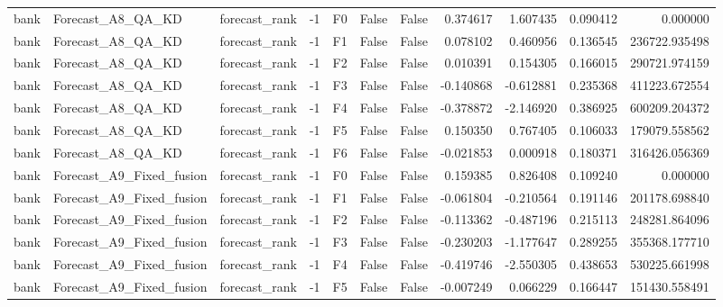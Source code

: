 \begin{tabular}{lllrlllrrrr}
      bank &            Forecast\_A8\_QA\_KD & forecast\_rank &    -1 &  F0 &           False &            False &  0.374617 &  1.607435 & 0.090412 &         0.000000 \\
      bank &            Forecast\_A8\_QA\_KD & forecast\_rank &    -1 &  F1 &           False &            False &  0.078102 &  0.460956 & 0.136545 &    236722.935498 \\
      bank &            Forecast\_A8\_QA\_KD & forecast\_rank &    -1 &  F2 &           False &            False &  0.010391 &  0.154305 & 0.166015 &    290721.974159 \\
      bank &            Forecast\_A8\_QA\_KD & forecast\_rank &    -1 &  F3 &           False &            False & -0.140868 & -0.612881 & 0.235368 &    411223.672554 \\
      bank &            Forecast\_A8\_QA\_KD & forecast\_rank &    -1 &  F4 &           False &            False & -0.378872 & -2.146920 & 0.386925 &    600209.204372 \\
      bank &            Forecast\_A8\_QA\_KD & forecast\_rank &    -1 &  F5 &           False &            False &  0.150350 &  0.767405 & 0.106033 &    179079.558562 \\
      bank &            Forecast\_A8\_QA\_KD & forecast\_rank &    -1 &  F6 &           False &            False & -0.021853 &  0.000918 & 0.180371 &    316426.056369 \\
      bank &     Forecast\_A9\_Fixed\_fusion & forecast\_rank &    -1 &  F0 &           False &            False &  0.159385 &  0.826408 & 0.109240 &         0.000000 \\
      bank &     Forecast\_A9\_Fixed\_fusion & forecast\_rank &    -1 &  F1 &           False &            False & -0.061804 & -0.210564 & 0.191146 &    201178.698840 \\
      bank &     Forecast\_A9\_Fixed\_fusion & forecast\_rank &    -1 &  F2 &           False &            False & -0.113362 & -0.487196 & 0.215113 &    248281.864096 \\
      bank &     Forecast\_A9\_Fixed\_fusion & forecast\_rank &    -1 &  F3 &           False &            False & -0.230203 & -1.177647 & 0.289255 &    355368.177710 \\
      bank &     Forecast\_A9\_Fixed\_fusion & forecast\_rank &    -1 &  F4 &           False &            False & -0.419746 & -2.550305 & 0.438653 &    530225.661998 \\
      bank &     Forecast\_A9\_Fixed\_fusion & forecast\_rank &    -1 &  F5 &           False &            False & -0.007249 &  0.066229 & 0.166447 &    151430.558491 \\

\end{tabular}
